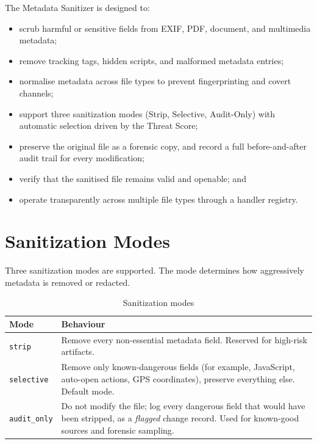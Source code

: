 \documentclass[12pt, a4paper]{report}
\begin{document}
The Metadata Sanitizer is designed to:
\begin{itemize}
    \item scrub harmful or sensitive fields from EXIF, PDF, document,
          and multimedia metadata;
    \item remove tracking tags, hidden scripts, and malformed metadata
          entries;
    \item normalise metadata across file types to prevent fingerprinting
          and covert channels;
    \item support three sanitization modes (Strip, Selective,
          Audit-Only) with automatic selection driven by the Threat
          Score;
    \item preserve the original file as a forensic copy, and record a
          full before-and-after audit trail for every modification;
    \item verify that the sanitised file remains valid and openable;
          and
    \item operate transparently across multiple file types through a
          handler registry.
\end{itemize}

\section{Sanitization Modes}

Three sanitization modes are supported. The mode determines how
aggressively metadata is removed or redacted.

\begin{table}[H]
\centering
\caption{Sanitization modes}
\label{tab:san_modes}
\begin{tabular}{|l|p{10cm}|}
\hline
\textbf{Mode} & \textbf{Behaviour} \\
\hline
\texttt{strip} & Remove every non-essential metadata field. Reserved for high-risk artifacts. \\
\hline
\texttt{selective} & Remove only known-dangerous fields (for example, JavaScript, auto-open actions, GPS coordinates), preserve everything else. Default mode. \\
\hline
\texttt{audit\_only} & Do not modify the file; log every dangerous field that would have been stripped, as a \emph{flagged} change record. Used for known-good sources and forensic sampling. \\
\hline
\end{tabular}
\end{table}
\end{document}
